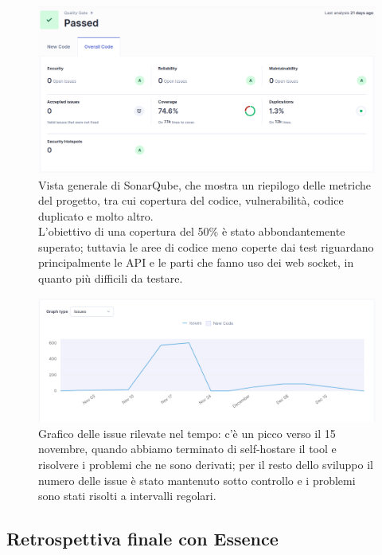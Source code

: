 \documentclass{article}
\begin{document}
\begin{figure}[H]
    \centering
    \includegraphics[width=1\textwidth]{sq_overview}
    \caption{Vista generale di SonarQube, che mostra un riepilogo delle metriche del progetto, tra cui copertura del codice, vulnerabilità, codice duplicato e molto altro. \\
    L'obiettivo di una copertura del 50\% è stato abbondantemente superato; tuttavia le aree di codice meno coperte dai test riguardano principalmente le API e le parti che fanno
    uso dei web socket, in quanto più difficili da testare.}
    \label{fig:sq_overview}
\end{figure}

\begin{figure}[H]
    \centering
    \includegraphics[width=1\textwidth]{sq_issues}
    \caption{Grafico delle issue rilevate nel tempo: c'è un picco verso il 15 novembre, quando abbiamo terminato di self-hostare il tool e risolvere i problemi che ne sono derivati; per il resto dello
    sviluppo il numero delle issue è stato mantenuto sotto controllo e i problemi sono stati risolti a intervalli regolari.}
    \label{fig:sq_issues}
\end{figure}


\subsection{Retrospettiva finale con Essence}
\end{document}

